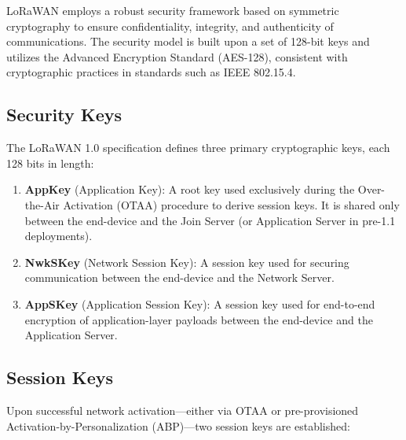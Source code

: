 LoRaWAN employs a robust security framework based on symmetric cryptography to ensure confidentiality, integrity, and authenticity of communications. The security model is built upon a set of 128-bit keys and utilizes the Advanced Encryption Standard (AES-128), consistent with cryptographic practices in standards such as IEEE 802.15.4.

\subsection{Security Keys}

The LoRaWAN 1.0 specification defines three primary cryptographic keys, each 128 bits in length:

\begin{enumerate}
    \item \textbf{AppKey} (Application Key): A root key used exclusively during the Over-the-Air Activation (OTAA) procedure to derive session keys. It is shared only between the end-device and the Join Server (or Application Server in pre-1.1 deployments).
    \item \textbf{NwkSKey} (Network Session Key): A session key used for securing communication between the end-device and the Network Server.
    \item \textbf{AppSKey} (Application Session Key): A session key used for end-to-end encryption of application-layer payloads between the end-device and the Application Server.
\end{enumerate}

\subsection{Session Keys}

Upon successful network activation—either via OTAA or pre-provisioned Activation-by-Personalization (ABP)—two session keys are established:

